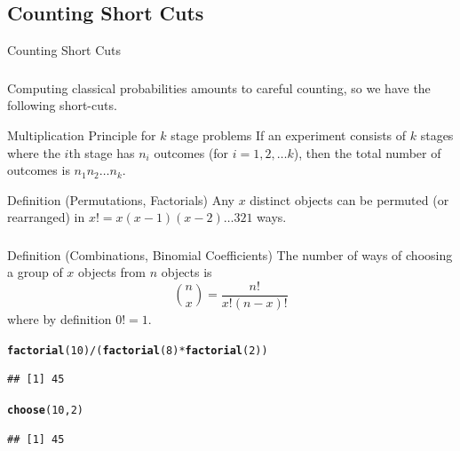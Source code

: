 \documentclass[t,xcolor=pdftex,dvipsnames,table]{beamer}\usepackage[]{graphicx}\usepackage[]{color}
\makeatletter
\newcommand{\hlnum}[1]{\textcolor[rgb]{0.686,0.059,0.569}{#1}}%
\newcommand{\hlopt}[1]{\textcolor[rgb]{0,0,0}{#1}}%
\newcommand{\hlstd}[1]{\textcolor[rgb]{0.345,0.345,0.345}{#1}}%
\newcommand{\hlkwd}[1]{\textcolor[rgb]{0.737,0.353,0.396}{\textbf{#1}}}%
\newenvironment{kframe}{%
 \def\at@end@of@kframe{}%
 \ifinner\ifhmode%
  \def\at@end@of@kframe{\end{minipage}}%
  \begin{minipage}{\columnwidth}%
 \fi\fi%
 \def\FrameCommand##1{\hskip\@totalleftmargin \hskip-\fboxsep
 \colorbox{shadecolor}{##1}\hskip-\fboxsep
     \hskip-\linewidth \hskip-\@totalleftmargin \hskip\columnwidth}%
 \MakeFramed {\advance\hsize-\width
   \@totalleftmargin\z@ \linewidth\hsize
   \@setminipage}}%
 {\par\unskip\endMakeFramed%
 \at@end@of@kframe}
\newenvironment{knitrout}{}{} %
\makeatother
\begin{document}
\subsection[]{Counting Short Cuts}
\begin{frame}[label=Factorials]{Counting Short Cuts}
\frametitle{} 

Computing classical probabilities amounts to careful counting, so we have the following short-cuts.

\vspace{.5cm}
\begin{block}{Multiplication Principle for $k$ stage problems}
If an experiment consists of $k$ stages where the $i$th stage has $n_{i}$ outcomes (for $i=1,2,\ldots k$), then the total number of outcomes is $n_{1} n_{2} \ldots n_{k}$.
\end{block}

\vspace{.5cm}
\begin{block}{Definition (Permutations, Factorials)}
Any $x$ distinct objects can be permuted (or rearranged) in $x! = x(x-1)(x-2) \ldots 3 2 1$ ways.
\end{block}
\end{frame}

\begin{frame}[label=BinomialCoefficients,fragile]
\frametitle{} 

\begin{block}{Definition (Combinations, Binomial Coefficients)}
The number of ways of choosing a group of $x$ objects from $n$ objects is 
\[ {n \choose x}  = \frac{n!}{x! (n-x)!} \]
where by definition $0! = 1$.
\end{block}

\begin{knitrout}
\color{fgcolor}\begin{kframe}
\begin{alltt}
\hlkwd{factorial}\hlstd{(}\hlnum{10}\hlstd{)}\hlopt{/}\hlstd{(}\hlkwd{factorial}\hlstd{(}\hlnum{8}\hlstd{)}\hlopt{*}\hlkwd{factorial}\hlstd{(}\hlnum{2}\hlstd{))}
\end{alltt}
\begin{verbatim}
## [1] 45
\end{verbatim}
\begin{alltt}
\hlkwd{choose}\hlstd{(}\hlnum{10}\hlstd{,}\hlnum{2}\hlstd{)}
\end{alltt}
\begin{verbatim}
## [1] 45
\end{verbatim}
\end{kframe}
\end{knitrout}
\end{frame}
 
\end{document}

